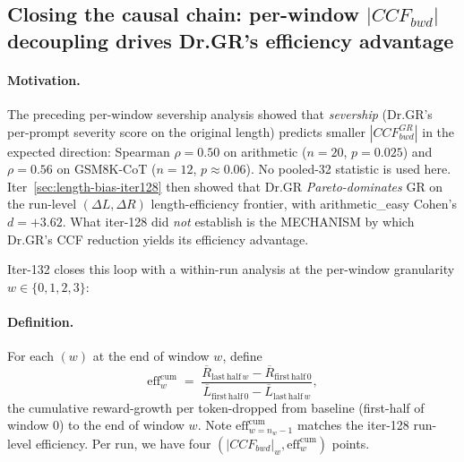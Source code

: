 %

\subsection{Closing the causal chain: per-window $|CCF_{bwd}|$ decoupling
drives Dr.GR's efficiency advantage}
\label{sec:length-bias-iter132}

\paragraph{Motivation.}
The preceding per-window severship analysis showed that
\emph{severship} (Dr.GR's per-prompt severity score on the original
length) predicts smaller $|CCF^{GR}_{bwd}|$ in the expected direction:
Spearman $\rho=0.50$ on arithmetic ($n=20$, $p=0.025$) and
$\rho=0.56$ on GSM8K-CoT ($n=12$, $p\approx0.06$). No pooled-32
statistic is used here.
Iter~\ref{sec:length-bias-iter128} then showed that Dr.GR
\emph{Pareto-dominates} GR on the run-level $(\Delta L, \Delta R)$
length-efficiency frontier, with arithmetic\_easy Cohen's $d=+3.62$.
What iter-128 did \emph{not} establish is the MECHANISM by which
Dr.GR's CCF reduction yields its efficiency advantage.

Iter-132 closes this loop with a within-run analysis at the
per-window granularity $w\in\{0,1,2,3\}$:

\paragraph{Definition.}
For each $(w)$ at the end of window $w$, define
\[
  \mathrm{eff}^{\mathrm{cum}}_w \;=\;
    \frac{\overline R_{\mathrm{last\,half}\,w} - \overline R_{\mathrm{first\,half}\,0}}
         {\overline L_{\mathrm{first\,half}\,0} - \overline L_{\mathrm{last\,half}\,w}},
\]
the cumulative reward-growth per token-dropped from baseline
(first-half of window 0) to the end of window $w$.  Note
$\mathrm{eff}^{\mathrm{cum}}_{w=n_w-1}$ matches the iter-128
run-level efficiency.  Per run, we have four $(|CCF_{bwd}|_w,
\mathrm{eff}^{\mathrm{cum}}_w)$ points.

